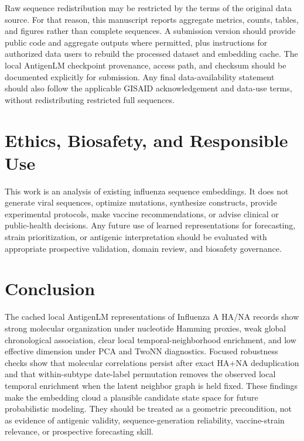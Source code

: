 \documentclass[11pt]{article}
\begin{document}
Raw sequence redistribution may be restricted by the terms of the original data source. For that reason, this manuscript reports aggregate metrics, counts, tables, and figures rather than complete sequences. A submission version should provide public code and aggregate outputs where permitted, plus instructions for authorized data users to rebuild the processed dataset and embedding cache. The local AntigenLM checkpoint provenance, access path, and checksum should be documented explicitly for submission. Any final data-availability statement should also follow the applicable GISAID acknowledgement and data-use terms, without redistributing restricted full sequences.

\section{Ethics, Biosafety, and Responsible Use}

This work is an analysis of existing influenza sequence embeddings. It does not generate viral sequences, optimize mutations, synthesize constructs, provide experimental protocols, make vaccine recommendations, or advise clinical or public-health decisions. Any future use of learned representations for forecasting, strain prioritization, or antigenic interpretation should be evaluated with appropriate prospective validation, domain review, and biosafety governance.

\section{Conclusion}

The cached local AntigenLM representations of Influenza A HA/NA records show strong molecular organization under nucleotide Hamming proxies, weak global chronological association, clear local temporal-neighborhood enrichment, and low effective dimension under PCA and TwoNN diagnostics. Focused robustness checks show that molecular correlations persist after exact HA+NA deduplication and that within-subtype date-label permutation removes the observed local temporal enrichment when the latent neighbor graph is held fixed. These findings make the embedding cloud a plausible candidate state space for future probabilistic modeling. They should be treated as a geometric precondition, not as evidence of antigenic validity, sequence-generation reliability, vaccine-strain relevance, or prospective forecasting skill.



\end{document}
